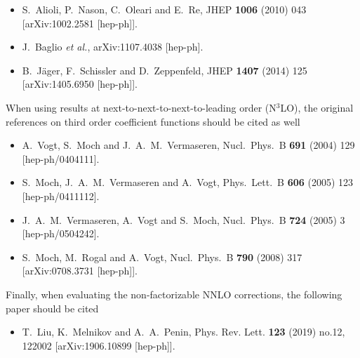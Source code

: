 \documentclass[12pt,a4]{article}
\begin{document}
\begin{itemize}
\item S.~Alioli, P.~Nason, C.~Oleari and E.~Re,
  JHEP {\bf 1006} (2010) 043
  [arXiv:1002.2581 [hep-ph]].
\item J.~Baglio {\it et al.},
  arXiv:1107.4038 [hep-ph].
\item B.~J\"ager, F.~Schissler and D.~Zeppenfeld,
  JHEP {\bf 1407} (2014) 125
  [arXiv:1405.6950 [hep-ph]].
\end{itemize}

When using results at next-to-next-to-next-to-leading order (N$^3$LO), the
original references on third order coefficient functions should be
cited as well
\begin{itemize}
\item A.~Vogt, S.~Moch and J.~A.~M.~Vermaseren,
  Nucl.\ Phys.\ B {\bf 691} (2004) 129
  [hep-ph/0404111].
\item S.~Moch, J.~A.~M.~Vermaseren and A.~Vogt,
  Phys.\ Lett.\ B {\bf 606} (2005) 123
  [hep-ph/0411112].
\item J.~A.~M.~Vermaseren, A.~Vogt and S.~Moch,
  Nucl.\ Phys.\ B {\bf 724} (2005) 3
  [hep-ph/0504242].
\item S.~Moch, M.~Rogal and A.~Vogt,
  Nucl.\ Phys.\ B {\bf 790} (2008) 317
  [arXiv:0708.3731 [hep-ph]].
\end{itemize}

Finally, when evaluating the non-factorizable NNLO corrections, the following
paper should be cited
\begin{itemize}
\item T.~Liu, K.~Melnikov and A.~A.~Penin,
  Phys. Rev. Lett. \textbf{123} (2019) no.12, 122002
  [arXiv:1906.10899 [hep-ph]].
\end{itemize}
\end{document}
